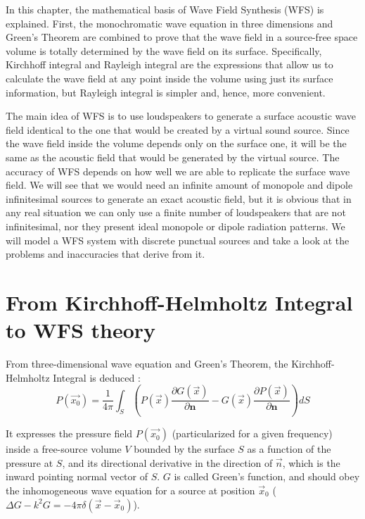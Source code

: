 In this chapter, the mathematical basis of Wave Field Synthesis (WFS) is explained. First, the monochromatic wave equation in three dimensions and Green's Theorem are combined to prove that the wave field in a source-free space volume is totally determined by the wave field on its surface. Specifically, Kirchhoff integral and Rayleigh integral are the expressions that allow us to calculate the wave field at any point inside the volume using just its surface information, but Rayleigh integral is simpler and, hence, more convenient. %

The main idea of WFS is to use loudspeakers to generate a surface acoustic wave field identical to the one that would be created by a virtual sound source. Since the wave field inside the volume depends only on the surface one, it will be the same as the acoustic field that would be generated by the virtual source. The accuracy of WFS depends on how well we are able to replicate the surface wave field. We will see that we would need an infinite amount of monopole and dipole infinitesimal sources to generate an exact acoustic field, but it is obvious that in any real situation we can only use a finite number of loudspeakers that are not infinitesimal, nor they present ideal monopole or dipole radiation patterns. We will model a WFS system with discrete punctual sources and take a look at the problems and inaccuracies that derive from it.

\section{From Kirchhoff-Helmholtz Integral to WFS theory}
From three-dimensional wave equation and Green's Theorem, the Kirchhoff-Helmholtz Integral is deduced \cite{BerkhoutSeismic} \cite{Verheijen}:
\begin{equation}
P(\vec{x_0}) = \frac{1}{4\pi} \int_{S} \left(P(\vec{x})\frac{\partial G(\vec{x})}{\partial \mathbf{n}} - G(\vec{x}) \frac{\partial P(\vec{x})}{\partial \mathbf{n}} \right) dS
\label{KirchhoffHelmholtz}
\end{equation}

It expresses the pressure field $P(\vec{x_0})$ (particularized for a given frequency) inside a free-source volume $V$ bounded by the surface $S$ as a function of the pressure at $S$, and its directional derivative in the direction of $\vec{n}$, which is the inward pointing normal vector of $S$. $G$ is called Green's function, and should obey the inhomogeneous wave equation for a source at position $\vec{x}_0$ ($\Delta G - k^2 G = -4\pi\delta(\vec{x} - \vec{x}_0)$).

